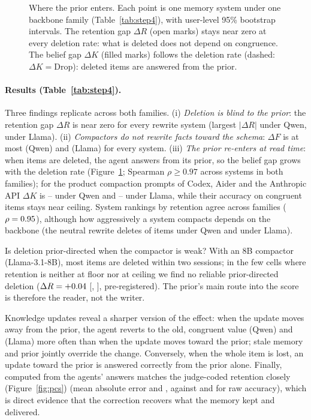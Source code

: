 

\begin{figure}[t]
\centering

\caption{Where the prior enters. Each point is one memory system under one backbone family (Table~\ref{tab:step4}),
with user-level 95\% bootstrap intervals. The retention gap $\Delta R$ (open marks) stays near zero at every deletion
rate: what is deleted does not depend on congruence. The belief gap $\Delta K$ (filled marks) follows the deletion rate
(dashed: $\Delta K=\text{Drop}$): deleted items are answered from the prior.}
\label{fig:readtime}
\end{figure}

\paragraph{Results (Table~\ref{tab:step4}).} Three findings replicate across both families. (i) \emph{Deletion is blind
to the prior}: the retention gap $\Delta R$ is near zero for every rewrite system (largest $|\Delta R|$ \dRQwenMaxAbs{}
under Qwen, \dRLlamaMaxAbs{} under Llama). (ii) \emph{Compactors do not rewrite facts toward the schema}: $\Delta F$ is at most \dFQwenMax{} (Qwen) and
\dFLlamaMax{} (Llama) for every system. (iii) \emph{The prior re-enters at read time}: when items are deleted, the agent answers
from its prior, so the belief gap grows with the deletion rate (Figure~\ref{fig:readtime}; Spearman $\rho\geq0.97$ across
systems in both families);
for the product compaction prompts of Codex, Aider and the Anthropic API $\Delta K$ is \dKrwQwenLo--\dKrwQwenHi{} under Qwen and \dKrwLlamaLo--\dKrwLlamaHi{}
under Llama, while their accuracy on congruent items stays near ceiling. System rankings by retention agree across families
($\rho=0.95$), although how aggressively a system compacts depends on the backbone (the neutral rewrite deletes
\dropNeutralRollQwen{} of items under Qwen and \dropNeutralRollLlama{} under Llama).

Is deletion prior-directed when the compactor is weak? With an 8B compactor (Llama-3.1-8B), most items are deleted within two
sessions; in the few cells where retention is neither at floor nor at ceiling we find no reliable prior-directed
deletion ($\Delta R=+0.04$ [\weakDrLo, \weakDrHi], pre-registered). The prior's main route into the score is therefore the
reader, not the writer.

Knowledge updates reveal a sharper version of the effect: when the update moves away from the prior, the agent
reverts to the old, congruent value \updQwen{} (Qwen) and \updLlama{} (Llama) more often than when the update moves toward
the prior; stale memory and prior jointly override the change. Conversely, when the whole item is lost, an update toward the prior
is answered correctly from the prior alone. Finally, \pcs{} computed from the agents' answers matches
the judge-coded retention closely (Figure~\ref{fig:pcs}) (mean absolute error \pcsMaeQwen{} and \pcsMaeLlama{}, against \accMaeQwen{} and
\accMaeLlama{} for raw accuracy), which is direct evidence that the correction recovers what the memory kept and delivered.

